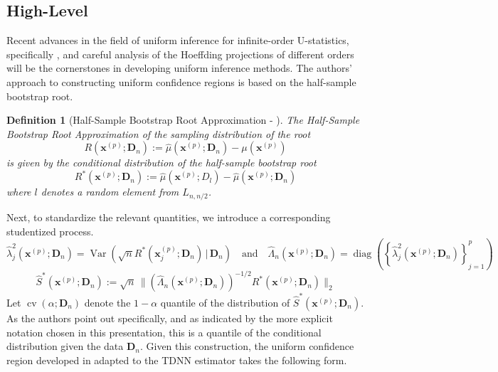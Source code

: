 \documentclass[letterpaper,10pt]{article}
\numberwithin{equation}{section}
\numberwithin{thm}{section}
\newtheorem{dfn}{Definition}
\renewcommand{\hat}{\widehat}
\newcommand{\1}{\mathbb{1}}
\begin{document}
\subsection{High-Level}
Recent advances in the field of uniform inference for infinite-order U-statistics, specifically \citet{ritzwoller_uniform_2024}, and careful analysis of the Hoeffding projections of different orders will be the cornerstones in developing uniform inference methods.
The authors' approach to constructing uniform confidence regions is based on the half-sample bootstrap root.

\vspace{0.5cm}
\begin{dfn}[Half-Sample Bootstrap Root Approximation - \citet{ritzwoller_uniform_2024}]
	The Half-Sample Bootstrap Root Approximation of the sampling distribution of the root
	\begin{equation}
		R\left(\mathbf{x}^{(p)}; \mathbf{D}_n\right)
		:= \hat{\mu}\left(\mathbf{x}^{(p)}; \mathbf{D}_n\right) - \mu(\mathbf{x}^{(p)})
	\end{equation}
	is given by the conditional distribution of the half-sample bootstrap root
	\begin{equation}
		R^{*}\left(\mathbf{x}^{(p)}; \mathbf{D}_n\right)
		:= \hat{\mu}\left(\mathbf{x}^{(p)}; D_l\right) - \hat{\mu}\left(\mathbf{x}^{(p)}; \mathbf{D}_n\right)
	\end{equation}
	where $l$ denotes a random element from $L_{n, n/2}$.
\end{dfn}
Next, to standardize the relevant quantities, we introduce a corresponding studentized process.
\begin{equation}
	\hat{\lambda}_{j}^{2}\left(\mathbf{x}^{(p)}; \mathbf{D}_n\right) = \operatorname{Var}\left(\sqrt{n} R^{*}(\mathbf{x}^{(p)}_{j}; \mathbf{D}_n) \, | \, \mathbf{D}_n\right)
	\quad \text{and} \quad
	\hat{\Lambda}_n\left(\mathbf{x}^{(p)}; \mathbf{D}_n\right) = \operatorname{diag}\left(\left\{\hat{\lambda}_{j}^{2}\left(\mathbf{x}^{(p)}; \mathbf{D}_n\right)\right\}_{j = 1}^{p}\right)
\end{equation}
\begin{equation}
	\hat{S}^{*}\left(\mathbf{x}^{(p)}; \mathbf{D}_n\right)
	:= \sqrt{n} \, \Big\| \left(\hat{\Lambda}_n\left(\mathbf{x}^{(p)}; \mathbf{D}_n\right)\right)^{-1/2} R^{*}\left(\mathbf{x}^{(p)}; \mathbf{D}_n\right)\Big\|_{2}
\end{equation}
Let $\operatorname{cv}\left(\alpha; \mathbf{D}_n\right)$ denote the $1-\alpha$ quantile of the distribution of $\hat{S}^{*}\left(\mathbf{x}^{(p)}; \mathbf{D}_n\right)$.
As the authors point out specifically, and as indicated by the more explicit notation chosen in this presentation, this is a quantile of the conditional distribution given the data $\mathbf{D}_n$.
Given this construction, the uniform confidence region developed in \citet{ritzwoller_uniform_2024} adapted to the TDNN estimator takes the following form.
\end{document}
